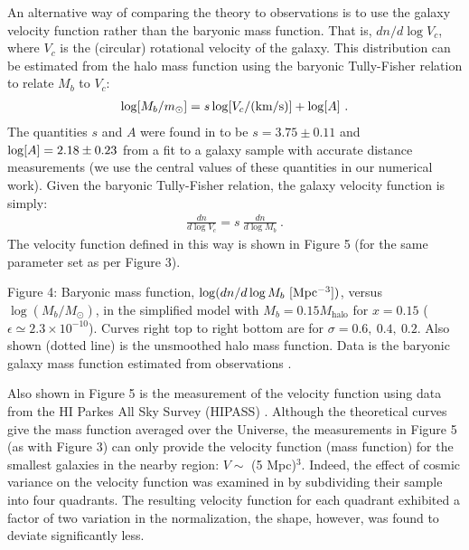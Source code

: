 \documentclass[12pt]{article}
\begin{document}
An alternative way of comparing the theory to observations is to use the galaxy velocity function rather than 
the baryonic mass function. That is, $dn/d \log V_c$, where $V_c$ is the (circular) rotational velocity of the galaxy. 
This distribution can be estimated from the halo mass function using the baryonic Tully-Fisher relation to relate $M_b$ to $V_c$: 
%
\begin{eqnarray}
\log [M_b/m_\odot] = s \log [V_c/({\rm km/s})] + \log [A] \ .
\end{eqnarray}
%
The quantities $s$ and $A$ were found in \cite{lelli} to be $s=3.75 \pm 0.11$ and ${\rm log}[A] = 2.18 \pm 0.23$ from a fit 
to a galaxy sample with accurate distance measurements (we use the central values of these quantities in our numerical work). 
Given the baryonic Tully-Fisher relation, the galaxy velocity function is simply:
%
\begin{eqnarray}
\frac{dn}{d\log V_c} = s \ \frac{dn}{d\log M_b} \ .
\end{eqnarray}
The velocity function defined in this way is shown in Figure 5 (for the same parameter set as per Figure 3).

\centerline{}
\vskip 0.29cm
\noindent
{\small Figure 4: Baryonic mass function, $\log (dn/d\log M_{b} \ [\rm Mpc^{-3}])$, versus $\log (M_{b}/M_{\odot})$, 
in the simplified model with $M_b = 0.15M_{\text{halo}}$ for $x=0.15$ ($\epsilon  \simeq 2.3 \times 10^{-10}$).
Curves right top to right bottom are for
$\sigma = 0.6, \ 0.4,\ 0.2$. Also shown (dotted line) is the unsmoothed halo mass function.  
Data is the baryonic galaxy mass function estimated from observations \cite{1208}.}
\vskip 1.4cm


Also shown in Figure 5 is the measurement of the velocity function using data from the HI Parkes All Sky Survey (HIPASS) \cite{Zwaan}.
Although the theoretical curves give the mass function averaged over the Universe,
the measurements in Figure 5 (as with Figure 3) can only provide the velocity function (mass function) for the smallest galaxies in the nearby region: 
$V \sim $ (5 Mpc)$^3$. Indeed, the effect of cosmic variance on 
the velocity function was examined in \cite{Zwaan}
by subdividing their sample into four quadrants. 
The resulting velocity function for each quadrant exhibited a 
factor of two variation in the normalization, 
the shape, however, was found to deviate significantly less.
\end{document}
